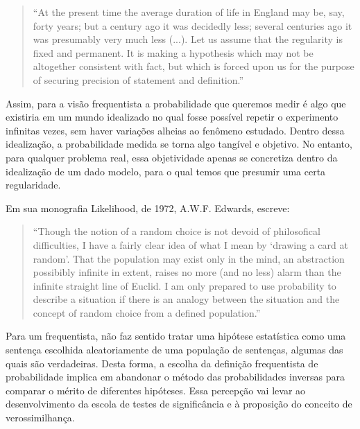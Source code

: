 \begin{quote}
``At the present time the average duration of life in England may be, say, forty years; but a century ago it was decidedly less;
several centuries ago it was presumably very much less (...). Let us assume that the regularity is fixed and permanent. It is
making a hypothesis which may not be altogether consistent with fact, but which is forced upon us for the purpose of securing
precision of statement and definition.''\citep{Venn1866}
\end{quote}

Assim, para a visão frequentista a probabilidade que queremos medir é algo que existiria em um mundo idealizado no qual fosse
possível repetir o experimento infinitas vezes, sem haver variações alheias ao fenômeno estudado. Dentro dessa idealização,
a probabilidade medida se torna algo tangível e objetivo. No entanto, para qualquer problema real, essa objetividade
apenas se concretiza dentro da idealização de um dado modelo, para o qual temos que presumir uma certa regularidade. 

Em sua monografia Likelihood, de 1972, A.W.F. Edwards, escreve:

\begin{quote}
``Though the notion of a random choice is not devoid of philosofical difficulties, I have a fairly clear idea of what I mean
by `drawing a card at random'. That the population may exist only in the mind, an abstraction possibibly infinite in extent,
raises no more (and no less) alarm than the infinite straight line of Euclid. I am only prepared to use probability to describe
a situation if there is an analogy between the situation and the concept of random choice from a defined population.''
\citep{Edwards72}
\end{quote}

Para um frequentista,
não faz sentido tratar uma hipótese estatística como uma sentença escolhida aleatoriamente de uma população de sentenças, algumas
das quais são verdadeiras. %
Desta forma, a escolha da definição frequentista de probabilidade implica em abandonar o método
das probabilidades inversas para comparar o mérito de diferentes
hipóteses. %
Essa percepção vai levar ao desenvolvimento
da escola de testes de significância e à proposição do conceito de verossimilhança.

